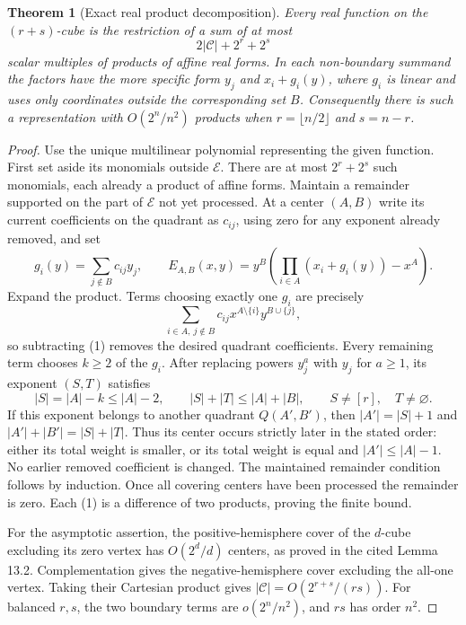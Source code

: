 \documentclass[11pt]{article}
\newtheorem{theorem}{Theorem}
\begin{document}
\begin{theorem}[Exact real product decomposition]
Every real function on the $(r+s)$-cube is the restriction of a sum of
at most
\[
 2|\mathcal C|+2^r+2^s
\]
scalar multiples of products of affine real forms. In each non-boundary
summand the factors have the more specific form
$y_j$ and $x_i+g_i(y)$, where $g_i$ is linear and uses only coordinates
outside the corresponding set $B$.
Consequently there is such a representation with $O(2^n/n^2)$ products
when $r=\lfloor n/2\rfloor$ and $s=n-r$.
\end{theorem}
\begin{proof}
Use the unique multilinear polynomial representing the given function.
First set aside its monomials outside $\mathcal E$. There are at most
$2^r+2^s$ such monomials, each already a product of affine forms.
Maintain a remainder supported on the part of $\mathcal E$ not yet
processed. At a center $(A,B)$ write its current coefficients on the
quadrant as $c_{ij}$, using zero for any exponent already removed, and set
\[
 g_i(y)=\sum_{j\notin B}c_{ij}y_j,
 \qquad
 E_{A,B}(x,y)=y^B\left(\prod_{i\in A}(x_i+g_i(y))-x^A\right).
 \tag{1}
\]
Expand the product. Terms choosing exactly one $g_i$ are precisely
\[
 \sum_{i\in A,\ j\notin B}c_{ij}x^{A\setminus\{i\}}y^{B\cup\{j\}},
 \tag{2}
\]
so subtracting (1) removes the desired quadrant coefficients. Every
remaining term chooses $k\ge2$ of the $g_i$. After replacing powers
$y_j^a$ with $y_j$ for $a\ge1$, its exponent $(S,T)$ satisfies
\[
 |S|=|A|-k\le |A|-2,\qquad
 |S|+|T|\le |A|+|B|,
 \qquad S\ne[r],\quad T\ne\varnothing.
 \tag{3}
\]
If this exponent belongs to another quadrant $Q(A',B')$, then
$|A'|=|S|+1$ and $|A'|+|B'|=|S|+|T|$. Thus its center occurs strictly
later in the stated order: either its total weight is smaller, or its
total weight is equal and $|A'|\le |A|-1$. No earlier removed coefficient
is changed. The maintained remainder condition follows by induction.
Once all covering centers have been processed the remainder is zero.
Each (1) is a difference of two products, proving the finite bound.

For the asymptotic assertion, the positive-hemisphere cover of the
$d$-cube excluding its zero vertex has $O(2^d/d)$ centers, as proved
in the cited Lemma 13.2. Complementation gives the negative-hemisphere
cover excluding the all-one vertex. Taking their Cartesian product
gives $|\mathcal C|=O(2^{r+s}/(rs))$. For balanced $r,s$, the two boundary
terms are $o(2^n/n^2)$, and $rs$ has order $n^2$.
\end{proof}
\end{document}
